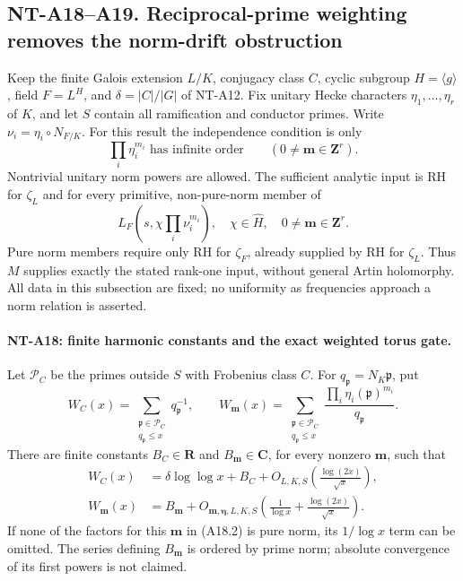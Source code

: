 \subsection*{NT-A18--A19. Reciprocal-prime weighting removes the norm-drift obstruction}

Keep the finite Galois extension \(L/K\), conjugacy class
\(C\), cyclic subgroup \(H=\langle g\rangle\), field
\(F=L^H\), and \(\delta=|C|/|G|\) of NT-A12.
Fix unitary Hecke characters \(\eta_1,\ldots,\eta_r\)
of \(K\), and let \(S\) contain all ramification and
conductor primes. Write
\(\nu_i=\eta_i\circ N_{F/K}\).
For this result the independence condition is only
\[
 \prod_i\eta_i^{m_i}\text{ has infinite order}
              \qquad(0\ne\mathbf m\in\mathbf Z^r).         \tag{A18.1}
\]
Nontrivial unitary norm powers are allowed.
The sufficient analytic input is RH for \(\zeta_L\)
and for every primitive, non-pure-norm member of
\[
 L_F\left(s,\chi\prod_i\nu_i^{m_i}\right),
      \quad \chi\in\widehat H,\quad
                         0\ne\mathbf m\in\mathbf Z^r .
                                                               \tag{A18.2}
\]
Pure norm members require only RH for \(\zeta_F\),
already supplied by RH for \(\zeta_L\). Thus \(M\)
supplies exactly the stated rank-one input, without
general Artin holomorphy. All data in this subsection
are fixed; no uniformity as frequencies approach a
norm relation is asserted.

\paragraph{NT-A18: finite harmonic constants and the exact weighted torus gate.}
Let \(\mathcal P_C\) be the primes outside \(S\) with
Frobenius class \(C\). For \(q_{\mathfrak p}=N_K\mathfrak p\),
put
\[
 W_C(x)=\sum_{\substack{\mathfrak p\in\mathcal P_C\\
                                      q_{\mathfrak p}\le x}}
                       q_{\mathfrak p}^{-1},\qquad
 W_{\mathbf m}(x)=
 \sum_{\substack{\mathfrak p\in\mathcal P_C\\
                                      q_{\mathfrak p}\le x}}
       \frac{\prod_i\eta_i(\mathfrak p)^{m_i}}{q_{\mathfrak p}}.
 \]
There are finite constants \(B_C\in\mathbf R\) and
\(B_{\mathbf m}\in\mathbf C\), for every nonzero
\(\mathbf m\), such that
\[
 \begin{aligned}
 W_C(x)&=\delta\log\log x+B_C
                         +O_{L,K,S}\!\left(\frac{\log(2x)}{\sqrt x}\right),\\
 W_{\mathbf m}(x)&=B_{\mathbf m}
          +O_{\mathbf m,\boldsymbol\eta,L,K,S}\!
              \left(\frac1{\log x}+\frac{\log(2x)}{\sqrt x}\right).
 \end{aligned}                                             \tag{A18.3}
\]
If none of the factors for this \(\mathbf m\) in
(A18.2) is pure norm, its \(1/\log x\) term can be
omitted. The series defining \(B_{\mathbf m}\) is
ordered by prime norm; absolute convergence of its
first powers is not claimed.

